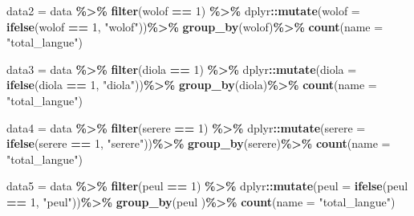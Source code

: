 \documentclass[
]{article}
\newenvironment{Shaded}{\begin{snugshade}}{\end{snugshade}}
\newcommand{\AttributeTok}[1]{\textcolor[rgb]{0.13,0.29,0.53}{#1}}
\newcommand{\DecValTok}[1]{\textcolor[rgb]{0.00,0.00,0.81}{#1}}
\newcommand{\FunctionTok}[1]{\textcolor[rgb]{0.13,0.29,0.53}{\textbf{#1}}}
\newcommand{\NormalTok}[1]{#1}
\newcommand{\OtherTok}[1]{\textcolor[rgb]{0.56,0.35,0.01}{#1}}
\newcommand{\SpecialCharTok}[1]{\textcolor[rgb]{0.81,0.36,0.00}{\textbf{#1}}}
\newcommand{\StringTok}[1]{\textcolor[rgb]{0.31,0.60,0.02}{#1}}
\begin{document}
\begin{Shaded}
\begin{Highlighting}[]
\NormalTok{data2 }\OtherTok{=}\NormalTok{  data }\SpecialCharTok{\%\textgreater{}\%}
\FunctionTok{filter}\NormalTok{(wolof }\SpecialCharTok{==} \DecValTok{1}\NormalTok{) }\SpecialCharTok{\%\textgreater{}\%} 
\NormalTok{  dplyr}\SpecialCharTok{::}\FunctionTok{mutate}\NormalTok{(}\AttributeTok{wolof =} \FunctionTok{ifelse}\NormalTok{(wolof }\SpecialCharTok{==} \DecValTok{1}\NormalTok{, }\StringTok{"wolof"}\NormalTok{))}\SpecialCharTok{\%\textgreater{}\%}
  \FunctionTok{group\_by}\NormalTok{(wolof)}\SpecialCharTok{\%\textgreater{}\%} 
  \FunctionTok{count}\NormalTok{(}\AttributeTok{name =} \StringTok{"total\_langue"}\NormalTok{)}

\NormalTok{data3 }\OtherTok{=}\NormalTok{  data }\SpecialCharTok{\%\textgreater{}\%}
\FunctionTok{filter}\NormalTok{(diola }\SpecialCharTok{==} \DecValTok{1}\NormalTok{) }\SpecialCharTok{\%\textgreater{}\%} 
\NormalTok{  dplyr}\SpecialCharTok{::}\FunctionTok{mutate}\NormalTok{(}\AttributeTok{diola =} \FunctionTok{ifelse}\NormalTok{(diola }\SpecialCharTok{==} \DecValTok{1}\NormalTok{, }\StringTok{"diola"}\NormalTok{))}\SpecialCharTok{\%\textgreater{}\%} 
  \FunctionTok{group\_by}\NormalTok{(diola)}\SpecialCharTok{\%\textgreater{}\%} 
  \FunctionTok{count}\NormalTok{(}\AttributeTok{name =} \StringTok{"total\_langue"}\NormalTok{)}

\NormalTok{data4 }\OtherTok{=}\NormalTok{  data }\SpecialCharTok{\%\textgreater{}\%}
\FunctionTok{filter}\NormalTok{(serere }\SpecialCharTok{==} \DecValTok{1}\NormalTok{) }\SpecialCharTok{\%\textgreater{}\%}  
\NormalTok{  dplyr}\SpecialCharTok{::}\FunctionTok{mutate}\NormalTok{(}\AttributeTok{serere =} \FunctionTok{ifelse}\NormalTok{(serere }\SpecialCharTok{==} \DecValTok{1}\NormalTok{, }\StringTok{"serere"}\NormalTok{))}\SpecialCharTok{\%\textgreater{}\%}
  \FunctionTok{group\_by}\NormalTok{(serere)}\SpecialCharTok{\%\textgreater{}\%}  
  \FunctionTok{count}\NormalTok{(}\AttributeTok{name =} \StringTok{"total\_langue"}\NormalTok{)}

\NormalTok{data5 }\OtherTok{=}\NormalTok{  data }\SpecialCharTok{\%\textgreater{}\%}
\FunctionTok{filter}\NormalTok{(peul  }\SpecialCharTok{==} \DecValTok{1}\NormalTok{) }\SpecialCharTok{\%\textgreater{}\%}  
\NormalTok{  dplyr}\SpecialCharTok{::}\FunctionTok{mutate}\NormalTok{(}\AttributeTok{peul  =} \FunctionTok{ifelse}\NormalTok{(peul  }\SpecialCharTok{==} \DecValTok{1}\NormalTok{, }\StringTok{"peul"}\NormalTok{))}\SpecialCharTok{\%\textgreater{}\%} 
  \FunctionTok{group\_by}\NormalTok{(peul )}\SpecialCharTok{\%\textgreater{}\%} 
  \FunctionTok{count}\NormalTok{(}\AttributeTok{name =} \StringTok{"total\_langue"}\NormalTok{)}


\end{Highlighting}
\end{Shaded}
\end{document}
